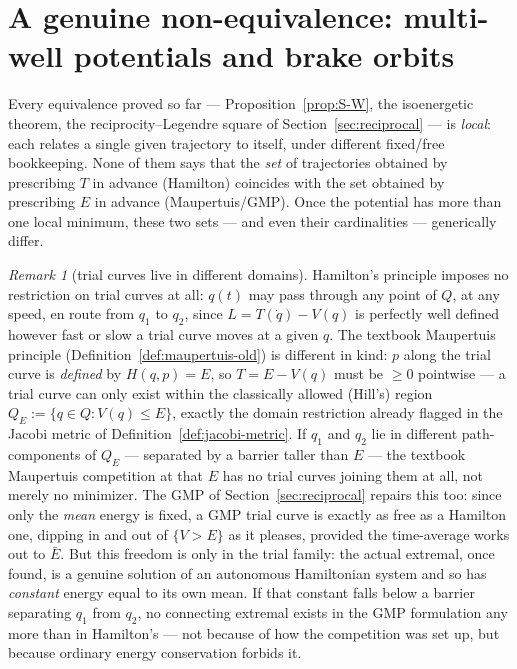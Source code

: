 \documentclass[11pt]{book}
\theoremstyle{definition}
\theoremstyle{plain}
\theoremstyle{remark}
\newtheorem{remark}[definition]{Remark}
\begin{document}
\section{A genuine non-equivalence: multi-well potentials and brake orbits}
\label{sec:nonequivalence}

Every equivalence proved so far --- Proposition~\ref{prop:S-W}, the isoenergetic theorem, the reciprocity--Legendre square of Section~\ref{sec:reciprocal} --- is \emph{local}: each relates a single given trajectory to itself, under different fixed/free bookkeeping. None of them says that the \emph{set} of trajectories obtained by prescribing $T$ in advance (Hamilton) coincides with the set obtained by prescribing $E$ in advance (Maupertuis/GMP). Once the potential has more than one local minimum, these two sets --- and even their cardinalities --- generically differ.

\begin{remark}[trial curves live in different domains]
Hamilton's principle imposes no restriction on trial curves at all: $q(t)$ may pass through any point of $Q$, at any speed, en route from $q_1$ to $q_2$, since $L=T(\dot q)-V(q)$ is perfectly well defined however fast or slow a trial curve moves at a given $q$. The textbook Maupertuis principle (Definition~\ref{def:maupertuis-old}) is different in kind: $p$ along the trial curve is \emph{defined} by $H(q,p)=E$, so $T=E-V(q)$ must be $\ge0$ pointwise --- a trial curve can only exist within the classically allowed (Hill's) region $Q_E:=\{q\in Q: V(q)\le E\}$, exactly the domain restriction already flagged in the Jacobi metric of Definition~\ref{def:jacobi-metric}. If $q_1$ and $q_2$ lie in different path-components of $Q_E$ --- separated by a barrier taller than $E$ --- the textbook Maupertuis competition at that $E$ has no trial curves joining them at all, not merely no minimizer. The GMP of Section~\ref{sec:reciprocal} repairs this too: since only the \emph{mean} energy is fixed, a GMP trial curve is exactly as free as a Hamilton one, dipping in and out of $\{V>E\}$ as it pleases, provided the time-average works out to $\bar E$. But this freedom is only in the trial family: the actual extremal, once found, is a genuine solution of an autonomous Hamiltonian system and so has \emph{constant} energy equal to its own mean. If that constant falls below a barrier separating $q_1$ from $q_2$, no connecting extremal exists in the GMP formulation any more than in Hamilton's --- not because of how the competition was set up, but because ordinary energy conservation forbids it.
\end{remark}
\end{document}
